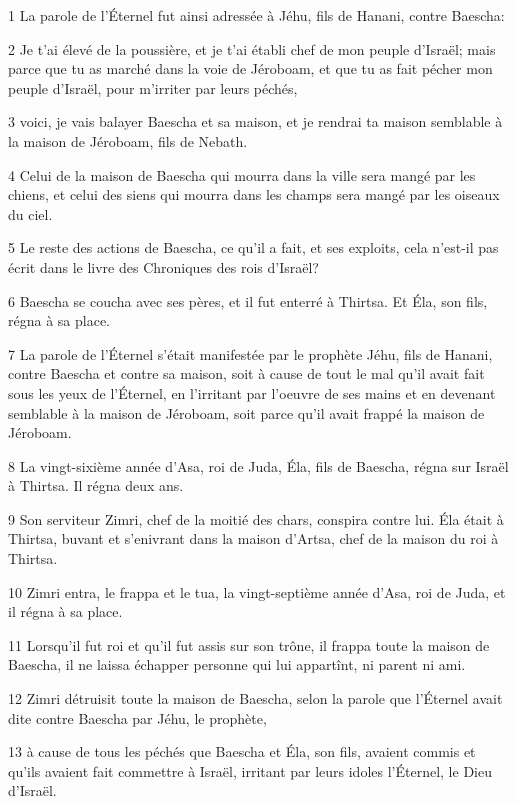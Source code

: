 \par 1 La parole de l'Éternel fut ainsi adressée à Jéhu, fils de Hanani, contre Baescha:
\par 2 Je t'ai élevé de la poussière, et je t'ai établi chef de mon peuple d'Israël; mais parce que tu as marché dans la voie de Jéroboam, et que tu as fait pécher mon peuple d'Israël, pour m'irriter par leurs péchés,
\par 3 voici, je vais balayer Baescha et sa maison, et je rendrai ta maison semblable à la maison de Jéroboam, fils de Nebath.
\par 4 Celui de la maison de Baescha qui mourra dans la ville sera mangé par les chiens, et celui des siens qui mourra dans les champs sera mangé par les oiseaux du ciel.
\par 5 Le reste des actions de Baescha, ce qu'il a fait, et ses exploits, cela n'est-il pas écrit dans le livre des Chroniques des rois d'Israël?
\par 6 Baescha se coucha avec ses pères, et il fut enterré à Thirtsa. Et Éla, son fils, régna à sa place.
\par 7 La parole de l'Éternel s'était manifestée par le prophète Jéhu, fils de Hanani, contre Baescha et contre sa maison, soit à cause de tout le mal qu'il avait fait sous les yeux de l'Éternel, en l'irritant par l'oeuvre de ses mains et en devenant semblable à la maison de Jéroboam, soit parce qu'il avait frappé la maison de Jéroboam.
\par 8 La vingt-sixième année d'Asa, roi de Juda, Éla, fils de Baescha, régna sur Israël à Thirtsa. Il régna deux ans.
\par 9 Son serviteur Zimri, chef de la moitié des chars, conspira contre lui. Éla était à Thirtsa, buvant et s'enivrant dans la maison d'Artsa, chef de la maison du roi à Thirtsa.
\par 10 Zimri entra, le frappa et le tua, la vingt-septième année d'Asa, roi de Juda, et il régna à sa place.
\par 11 Lorsqu'il fut roi et qu'il fut assis sur son trône, il frappa toute la maison de Baescha, il ne laissa échapper personne qui lui appartînt, ni parent ni ami.
\par 12 Zimri détruisit toute la maison de Baescha, selon la parole que l'Éternel avait dite contre Baescha par Jéhu, le prophète,
\par 13 à cause de tous les péchés que Baescha et Éla, son fils, avaient commis et qu'ils avaient fait commettre à Israël, irritant par leurs idoles l'Éternel, le Dieu d'Israël.
